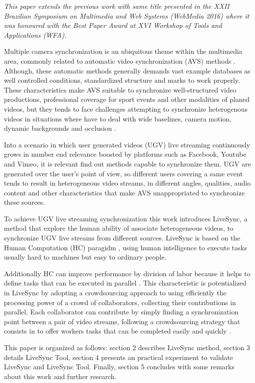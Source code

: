
\textit{This paper extends the previous work with same title \cite{delivesync} presented in the XXII Brazilian Symposium on Multimedia and Web Systems (WebMedia 2016) where it was honoured with the Best Paper Award at XVI Workshop of Tools and Applications (WFA).}

Multiple camera synchronization is an ubiquitous theme within the multimedia area, commonly related to automatic video synchronization (AVS) methods \cite{wang2014videosnapping}. Although, these automatic methods generally demands vast example databases as well controlled conditions, standardized structure and marks to work properly.  These characteristics make AVS suitable to synchronize well-structured video productions, professional coverage for sport events and other modalities of planed videos, but they tends to face challenges attempting to synchronize heterogenous videos in situations where have to deal with wide baselines, camera motion, dynamic backgrounds and occlusion \cite{schweiger2013fully}.

Into a scenario in which user generated videos (UGV) live streaming continuously grows in number end relevance boosted by platforms such as Facebook, Youtube and Vimeo,  it is relevant find out methods capable to synchronize them. UGV are generated over the user's point of view, so different users covering a same event tends to result in heterogeneous video streams, in different angles, qualities, audio content and other characteristics that make AVS unappropriated to synchronize these sources.

To achieve UGV live streaming synchronization this work introduces LiveSync, a  method that explore the human ability of associate  heterogeneous videos, to synchronize UGV live streams from different sources. LiveSync is based on the Human Computation (HC) paragidm \cite{VonAhn:2005:HC:1168246}, using human intelligence to execute tasks usually hard to machines but easy to ordinary people. 

Additionally HC can improve performance by division of labor because it helps to define tasks that can be executed in parallel \cite{Rohwer:2010:NHC:1837885.1837897}. This characteristic is potentialized in LiveSync by adopting a crowdsourcing \cite{howe2006rise} approach to using efficiently the processing power of a crowd of collaborators, collecting their contributions in parallel. Each collaborator can contribute by simply finding a synchronization point between a pair of video streams, following a crowdsourcing strategy that consists in to offer workers tasks that can be completed easily and quickly \cite{Difallah:2015:DMC:2736277.2741685}.

This paper is organized as follows: section 2 describes LiveSync method, section 3 details LiveSync Tool, section 4 presents an practical experiment to validate LiveSync and LiveSync Tool. Finally, section 5 concludes with some remarks about this work and further research.   


